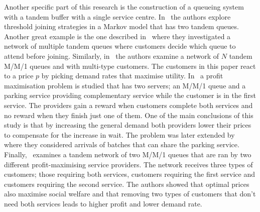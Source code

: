 Another specific part of this research is the construction of a queueing system
with a tandem buffer with a single service centre.
In~\cite{d2015pure} the authors explore threshold joining strategies in a 
Markov model that has two tandem queues.
Another great example is the one described in~\cite{burnetas2013customer}
where they investigated a network of multiple tandem queues where customers 
decide which queue to attend before joining.
Similarly, in~\cite{bacsar2002stackelberg} the authors examine a network of 
\(N\) tandem M/M/1 queues and with multi-type customers. 
The customers in this paper react to a price \(p\) by picking demand rates that 
maximise utility.
In~\cite{veltman2005equilibrium} a profit maximisation problem is studied that
has two servers; an M/M/1 queue and a parking service providing complementary 
service while the customer is in the first service. 
The providers gain a reward when customers complete both services and no reward 
when they finish just one of them.
One of the main conclusions of this study is that by increasing the general 
demand both providers lower their prices to compensate for the increase in wait.
The problem was later extended by~\cite{sun2009equilibrium} where they 
considered arrivals of batches that can share the parking service.
Finally,~\cite{afeche2007decentralized} examines a tandem network of two M/M/1 
queues that are ran by two different profit-maximising service providers.
The network receives three types of customers; those requiring both services, 
customers requiring the first service and customers requiring the second service.
The authors showed that optimal prices also maximise social welfare and that
removing two types of customers that don't need both services leads to higher 
profit and lower demand rate.

